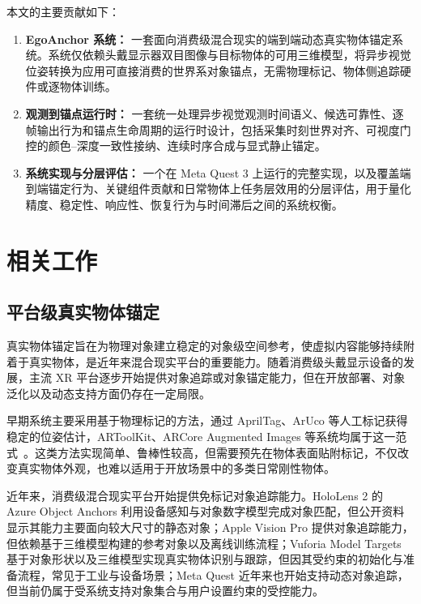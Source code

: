 \documentclass[review]{vgtc}
\begin{document}
本文的主要贡献如下：

\begin{enumerate}
  \item \textbf{EgoAnchor 系统：} 一套面向消费级混合现实的端到端动态真实物体锚定系统。系统仅依赖头戴显示器双目图像与目标物体的可用三维模型，将异步视觉位姿转换为应用可直接消费的世界系对象锚点，无需物理标记、物体侧追踪硬件或逐物体训练。
  \item \textbf{观测到锚点运行时：} 一套统一处理异步视觉观测时间语义、候选可靠性、逐帧输出行为和锚点生命周期的运行时设计，包括采集时刻世界对齐、可视度门控的颜色--深度一致性接纳、连续时序合成与显式静止锚定。
  \item \textbf{系统实现与分层评估：} 一个在 Meta Quest 3 上运行的完整实现，以及覆盖端到端锚定行为、关键组件贡献和日常物体上任务层效用的分层评估，用于量化精度、稳定性、响应性、恢复行为与时间滞后之间的系统权衡。
\end{enumerate}

\section{相关工作}\label{sec:related-work}


\subsection{平台级真实物体锚定}


真实物体锚定旨在为物理对象建立稳定的对象级空间参考，使虚拟内容能够持续附着于真实物体，是近年来混合现实平台的重要能力。随着消费级头戴显示设备的发展，主流 XR 平台逐步开始提供对象追踪或对象锚定能力，但在开放部署、对象泛化以及动态支持方面仍存在一定局限。

早期系统主要采用基于物理标记的方法，通过 AprilTag、ArUco 等人工标记获得稳定的位姿估计，ARToolKit、ARCore Augmented Images 等系统均属于这一范式~\cite{kato1999artoolkit,olson2011apriltag,garridojurado2014aruco,googleArcoreAugmentedImages}。这类方法实现简单、鲁棒性较高，但需要预先在物体表面贴附标记，不仅改变真实物体外观，也难以适用于开放场景中的多类日常刚性物体。

近年来，消费级混合现实平台开始提供免标记对象追踪能力。HoloLens 2 的 Azure Object Anchors 利用设备感知与对象数字模型完成对象匹配，但公开资料显示其能力主要面向较大尺寸的静态对象；Apple Vision Pro 提供对象追踪能力，但依赖基于三维模型构建的参考对象以及离线训练流程；Vuforia Model Targets 基于对象形状以及三维模型实现真实物体识别与跟踪，但因其受约束的初始化与准备流程，常见于工业与设备场景；Meta Quest 近年来也开始支持动态对象追踪，但当前仍属于受系统支持对象集合与用户设置约束的受控能力。
\end{document}
